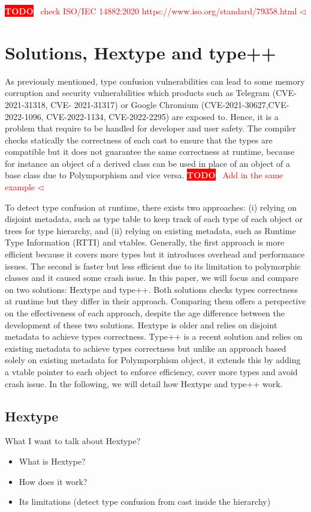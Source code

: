 \documentclass[a4paper,11pt,oneside]{report}
\newcommand{\todobox}[3]{%
       \colorbox{#1}{\textcolor{white}{\sffamily\bfseries\scriptsize #2}}%
       ~\textcolor{#1}{#3} %
       \textcolor{#1}{$\triangleleft$}%
}
\newcommand{\adrbqt}[1]{\todobox{red}{TODO}{#1}}
\begin{document}
\adrbqt{check ISO/IEC 14882:2020 https://www.iso.org/standard/79358.html}

\section{Solutions, Hextype and type++} \label{sec:cpp_solutions}

As previously mentioned, type confusion vulnerabilities can lead to some memory corruption and security vulnerabilities which products such as Telegram (CVE-2021-31318, CVE-
2021-31317) or Google Chromium (CVE-2021-30627,CVE-2022-1096, CVE-2022-1134, CVE-2022-2295) are exposed to. Hence, it is a problem that require to be handled for developer and user safety. 
The compiler checks statically the correctness of each cast to ensure that the types are compatible but it does not guarantee the same correctness at runtime, 
because for instance an object of a derived class can be used in place of an object of a base class due to Polymporphism and vice versa. \adrbqt{Add in the same example} 
To detect type confusion at runtime, there exists two approaches: (i) relying on disjoint metadata, such as type table to keep track of each type of each object or trees for type hierarchy, and 
(ii) relying on existing metadata, such as Runtime Type Information (RTTI) and vtables. 
Generally, the first approach is more efficient because it covers more types but it introduces overhead and performance issues. The second is faster but less efficient due to its limitation to polymorphic classes and it caused some crash issue. 
In this paper, we will focus and compare on two solutions: Hextype and type++. 
Both solutions checks types correctness at runtime but they differ in their approach. Comparing them offers a perspective on the effectiveness of each approach, despite the age difference between the development of these two solutions.
Hextype is older and relies on disjoint metadata to achieve types correctness. 
Type++ is a recent solution and relies on existing metadata to achieve types correctness but unlike an approach based solely on existing metadata for Polymporphism object,
it extends this by adding a vtable pointer to each object to enforce efficiency, cover more types and avoid crash issue. In the following, we will detail how Hextype and type++ work.

\subsection{Hextype}
What I want to talk about Hextype?
\begin{itemize}
       \item What is Hextype?
       \item How does it work?
       \item Its limitations (detect type confusion from cast inside the hierarchy)
\end{itemize}
\end{document}
